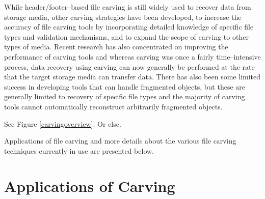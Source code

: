 While header/footer--based file carving is still widely used to recover data from storage media, other carving strategies have been developed, to increase the accuracy of file carving tools by incorporating detailed knowledge of specific file types and validation mechanisms, and to expand the scope of carving to other types of media.  Recent research has also concentrated on improving the performance of carving tools and whereas carving was once a fairly time--intensive process, data recovery using carving can now generally be performed at the rate that the target storage media can transfer data.  There has also been some limited success in developing tools that can handle fragmented objects, but these are generally limited to recovery of specific file types and the majority of carving tools cannot automatically reconstruct arbitrarily fragmented objects.   

See Figure \ref{carvingoverview}.  Or else.

Applications of file carving and more details about the various file carving techniques currently in use are presented below.

\section{Applications of Carving}

